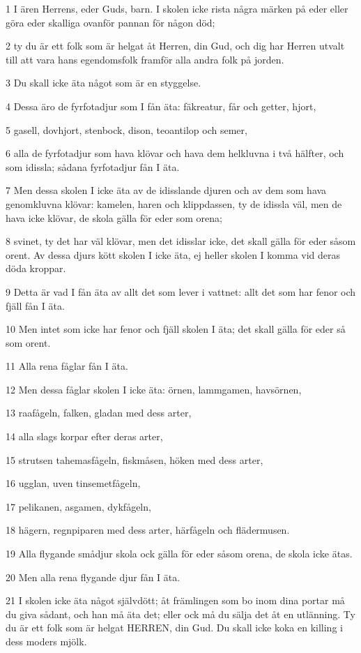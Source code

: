 \par 1 I ären Herrens, eder Guds, barn. I skolen icke rista några märken på eder eller göra eder skalliga ovanför pannan för någon död;
\par 2 ty du är ett folk som är helgat åt Herren, din Gud, och dig har Herren utvalt till att vara hans egendomsfolk framför alla andra folk på jorden.
\par 3 Du skall icke äta något som är en styggelse.
\par 4 Dessa äro de fyrfotadjur som I fån äta: fäkreatur, får och getter, hjort,
\par 5 gasell, dovhjort, stenbock, dison, teoantilop och semer,
\par 6 alla de fyrfotadjur som hava klövar och hava dem helkluvna i två hälfter, och som idissla; sådana fyrfotadjur fån I äta.
\par 7 Men dessa skolen I icke äta av de idisslande djuren och av dem som hava genomkluvna klövar: kamelen, haren och klippdassen, ty de idissla väl, men de hava icke klövar, de skola gälla för eder som orena;
\par 8 svinet, ty det har väl klövar, men det idisslar icke, det skall gälla för eder såsom orent. Av dessa djurs kött skolen I icke äta, ej heller skolen I komma vid deras döda kroppar.
\par 9 Detta är vad I fån äta av allt det som lever i vattnet: allt det som har fenor och fjäll fån I äta.
\par 10 Men intet som icke har fenor och fjäll skolen I äta; det skall gälla för eder så som orent.
\par 11 Alla rena fåglar fån I äta.
\par 12 Men dessa fåglar skolen I icke äta: örnen, lammgamen, havsörnen,
\par 13 raafågeln, falken, gladan med dess arter,
\par 14 alla slags korpar efter deras arter,
\par 15 strutsen tahemasfågeln, fiskmåsen, höken med dess arter,
\par 16 ugglan, uven tinsemetfågeln,
\par 17 pelikanen, asgamen, dykfågeln,
\par 18 hägern, regnpiparen med dess arter, härfågeln och flädermusen.
\par 19 Alla flygande smådjur skola ock gälla för eder såsom orena, de skola icke ätas.
\par 20 Men alla rena flygande djur fån I äta.
\par 21 I skolen icke äta något självdött; åt främlingen som bo inom dina portar må du giva sådant, och han må äta det; eller ock må du sälja det åt en utlänning. Ty du är ett folk som är helgat HERREN, din Gud. Du skall icke koka en killing i dess moders mjölk.
